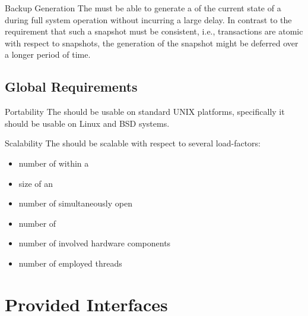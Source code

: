 \documentclass[a4paper, 12pt]{book}
\begin{document}
\begin{responsibility*}{Backup Generation}
  \label{resp:backup-generation}
  The \SYNEIGHT must be able to generate a  of the current
  state of a  during full system operation without incurring a
  large delay. In contrast to the requirement that such a snapshot
  must be consistent, i.e., transactions are atomic with
  respect to snapshots, the generation of the snapshot might be
  deferred over a longer period of time.
\end{responsibility*}



\subsection{Global Requirements}

\begin{responsibility*}{Portability}
  The \SYNEIGHT should be usable on standard UNIX platforms,
  specifically it should be usable on Linux and BSD systems.
\end{responsibility*}

\begin{responsibility*}{Scalability}
  The \SYNEIGHT should be scalable with respect to several load-factors: 
  \begin{itemize}
  \item number of  within a 
  \item size of an 
  \item number of simultaneously open 
  \item number of 
  \item number of involved hardware components
  \item number of employed threads
  \end{itemize}
\end{responsibility*}


\section{Provided Interfaces}
\end{document}
